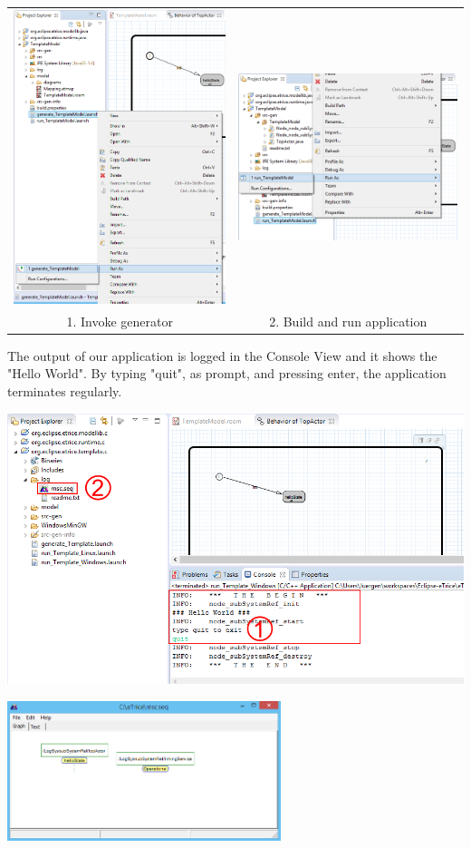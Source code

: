 \begin{tabular}{cc}
	\includegraphics[width=.45\textwidth]{images/014-generate.png} & 
	\includegraphics[width=.45\textwidth]{images/014-build_run.png} \\
	1. Invoke generator & 2. Build and run application
\end{tabular}

The output of our application is logged in the Console View and it shows the "Hello World". By typing "quit", as prompt, and pressing enter, the application terminates regularly.

\includegraphics[width=\textwidth]{images/013-quit-hello-msc.png}


\includegraphics[width=0.6\textwidth]{images/013-hello-msc.png}
